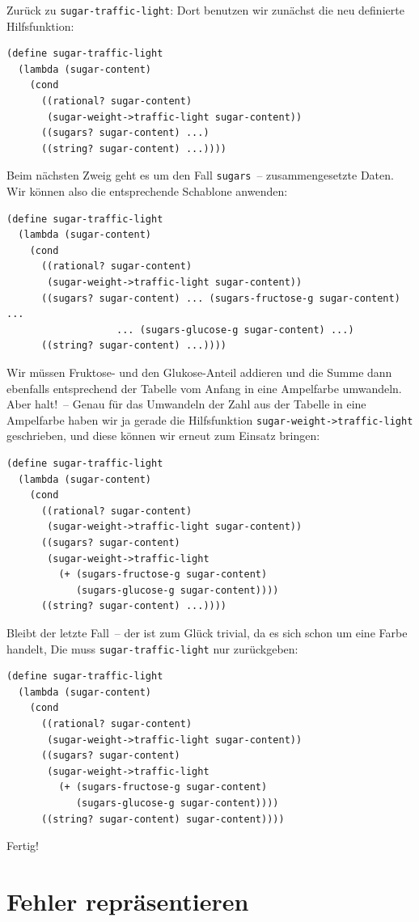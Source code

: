 %
Zurück zu \lstinline{sugar-traffic-light}: Dort benutzen wir zunächst die
neu definierte Hilfsfunktion:
%
\begin{lstlisting}
(define sugar-traffic-light
  (lambda (sugar-content)
    (cond
      ((rational? sugar-content)
       (sugar-weight->traffic-light sugar-content))
      ((sugars? sugar-content) ...)
      ((string? sugar-content) ...))))
\end{lstlisting}         
%
Beim nächsten Zweig geht es um den Fall \lstinline{sugars}~--
zusammengesetzte Daten.  Wir können also die entsprechende Schablone
anwenden:
%
\begin{lstlisting}
(define sugar-traffic-light
  (lambda (sugar-content)
    (cond
      ((rational? sugar-content)
       (sugar-weight->traffic-light sugar-content))
      ((sugars? sugar-content) ... (sugars-fructose-g sugar-content) ...
                   ... (sugars-glucose-g sugar-content) ...)
      ((string? sugar-content) ...))))
\end{lstlisting}         
%
Wir müssen Fruktose- und den Glukose-Anteil addieren und die Summe
dann ebenfalls entsprechend der Tabelle vom Anfang in eine Ampelfarbe
umwandeln.  Aber halt!~-- Genau für das Umwandeln der Zahl aus der
Tabelle in eine Ampelfarbe haben wir ja gerade die Hilfsfunktion
\lstinline{sugar-weight->traffic-light} geschrieben, und diese
können wir
erneut zum Einsatz bringen:
%
\begin{lstlisting}
(define sugar-traffic-light
  (lambda (sugar-content)
    (cond
      ((rational? sugar-content)
       (sugar-weight->traffic-light sugar-content))
      ((sugars? sugar-content)
       (sugar-weight->traffic-light
         (+ (sugars-fructose-g sugar-content)
            (sugars-glucose-g sugar-content))))
      ((string? sugar-content) ...))))
\end{lstlisting}         
%
Bleibt der letzte Fall~-- der ist zum Glück trivial, da es sich schon
um eine Farbe handelt, Die muss \lstinline{sugar-traffic-light} nur
zurückgeben:
%
\begin{lstlisting}
(define sugar-traffic-light
  (lambda (sugar-content)
    (cond
      ((rational? sugar-content)
       (sugar-weight->traffic-light sugar-content))
      ((sugars? sugar-content)
       (sugar-weight->traffic-light 
         (+ (sugars-fructose-g sugar-content)
            (sugars-glucose-g sugar-content))))
      ((string? sugar-content) sugar-content))))
\end{lstlisting}         
%
Fertig!

\section{Fehler repräsentieren}
\label{sec:slope}
\label{sec:maybe}

